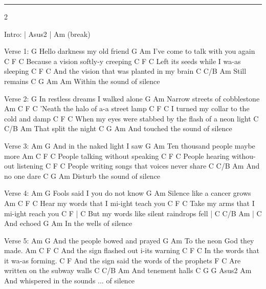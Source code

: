 \noindent\rule{\columnwidth}{1pt}

\begin{multicols}{2}
\begin{lstsong}
Intro: | Asus2 | Am (break)

Verse 1:
                       G
Hello darkness my old friend
G                            Am
 I've come to talk with you again
          C             F     C
Because a vision softly-y creeping
C                          F      C
 Left its seeds while I wa-as sleeping
C        F                             C
 And the vision that was planted in my brain
        C     C/B Am
Still remains
C           G        Am         Am
 Within the sound of silence

Verse 2:
                              G
 In restless dreams I walked alone
G                        Am
 Narrow streets of cobblestone
Am          C         F        C
 'Neath the halo of a-a street lamp
C                          F        C
 I turned my collar to the cold and damp
C        F                                        C
 When my eyes were stabbed by the flash of a neon light
               C     C/B Am
That split the night
C                G        Am
 And touched the sound of silence

Verse 3:
Am                        G
 And in the naked light I saw
G                           Am
 Ten thousand people maybe more
Am      C           F       C
 People talking without speaking
C                      F       C
 People hearing withou-out listening
C               F                       C
 People writing songs that voices never share
           C     C/B  Am
And no one dare
C            G        Am
 Disturb the sound of silence
\end{lstsong}
\columnbreak
\begin{lstsong}
Verse 4:
Am                        G
 Fools said I you do not know
G                      Am
 Silence like a cancer grows
Am       C               F          C
 Hear my words that I mi-ight teach you
C                       F          C
 Take my arms that I mi-ight reach you
C       F                          |  C 
 But my words like silent raindrops fell
| C  C/B Am    |     C
                 And echoed
       G        Am
In the wells of silence

Verse 5:
Am                        G
 And the people bowed and prayed
G                     Am
 To the neon God they made.
Am       C                  F      C
 And the sign flashed out i-its warning
C                        F     C
 In the words that it wa-as forming.
        C              F
And the sign said the words of the prophets
    F                     C
Are written on the subway walls
             C     C/B  Am
And tenement halls
    C                G     G       Asus2      Am
And whispered in the sounds ... of silence
\end{lstsong}
\end{multicols}
\newpage
